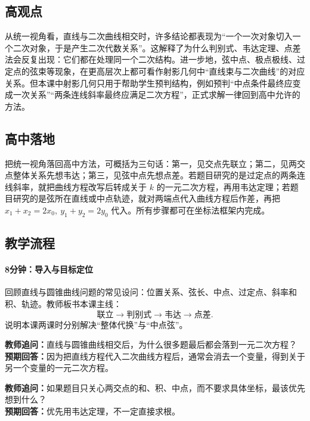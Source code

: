 \documentclass[UTF8,a4paper,11pt]{ctexart}
\begin{document}
\subsection*{高观点}

从统一视角看，直线与二次曲线相交时，许多结论都表现为“一个一次对象切入一个二次对象，于是产生二次代数关系”。这解释了为什么判别式、韦达定理、点差法会反复出现：它们都在处理同一个二次结构。进一步地，弦中点、极点极线、过定点的弦束等现象，在更高层次上都可看作射影几何中“直线束与二次曲线”的对应关系。但本课中射影几何只用于帮助学生预判结构，例如预判“中点条件最终应变成一次关系”“两条连线斜率最终应满足二次方程”，正式求解一律回到高中允许的方法。

\subsection*{高中落地}

把统一视角落回高中方法，可概括为三句话：第一，见交点先联立；第二，见两交点整体关系先想韦达；第三，见弦中点先想点差。若题目研究的是过定点的两条连线斜率，就把曲线方程改写后转成关于 $k$ 的一元二次方程，再用韦达定理；若题目研究的是弦所在直线或中点轨迹，就对两端点代入曲线方程后作差，再把 $x_1+x_2=2x_0,\ y_1+y_2=2y_0$ 代入。所有步骤都可在坐标法框架内完成。

\subsection*{教学流程}

\paragraph{8分钟：导入与目标定位}

回顾直线与圆锥曲线问题的常见设问：位置关系、弦长、中点、过定点、斜率和积、轨迹。教师板书本课主线：\[\text{联立}\to\text{判别式}\to\text{韦达}\to\text{点差}.\] 说明本课两课时分别解决“整体代换”与“中点弦”。

\noindent\textbf{教师追问：}直线与圆锥曲线相交后，为什么很多题最后都会落到一元二次方程？\\

\textbf{预期回答：}因为把直线方程代入二次曲线方程后，通常会消去一个变量，得到关于另一个变量的一元二次方程。\par

\noindent\textbf{教师追问：}如果题目只关心两交点的和、积、中点，而不要求具体坐标，最该优先想到什么？\\

\textbf{预期回答：}优先用韦达定理，不一定直接求根。\par
\end{document}
